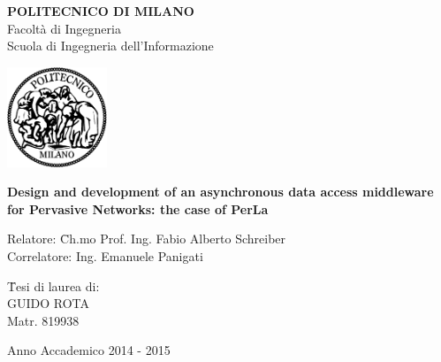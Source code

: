 \begin{titlepage}
\begin{center}

\begin{large}
	\textbf{POLITECNICO DI MILANO}\\
	Facoltà di Ingegneria\\
	Scuola di Ingegneria dell'Informazione
\end{large}

\vspace{2cm}
\includegraphics[width=3cm]{imgs/poli.eps}

\vspace{2cm}
\begin{Large}
\textbf{
Design and development of an asynchronous data access middleware for Pervasive Networks: the case of PerLa
}
\end{Large}

\vfill

\begin{normalsize}
\begin{onehalfspace}

	\begin{flushleft}
	\begin{tabbing}
	Relatore: \hspace{8pt} \= Ch.mo Prof. Ing. Fabio Alberto Schreiber\\
	Correlatore: \> Ing. Emanuele Panigati
	\end{tabbing}
	\end{flushleft}

	\vspace{1cm}
	\begin{flushright}
	\begin{tabbing}
	\hspace{330pt}
	\= Tesi di laurea di:\\
	\> GUIDO ROTA \\
	\> Matr. 819938\\
	\end{tabbing}
	\end{flushright}
	
\end{onehalfspace}
\end{normalsize}

\vspace{2cm}
\begin{small}
Anno Accademico 2014 - 2015
\end{small}

\end{center}
\end{titlepage}
\restoregeometry
